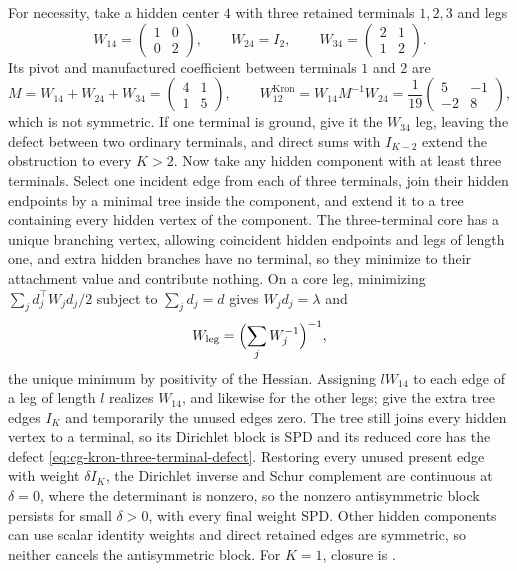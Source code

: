For necessity, take a hidden center \(4\) with three retained terminals
\(1,2,3\) and legs
\begin{equation}
W_{14}=\begin{pmatrix}1&0\\0&2\end{pmatrix},\qquad
W_{24}=I_2,\qquad
W_{34}=\begin{pmatrix}2&1\\1&2\end{pmatrix}.
\label{eq:cg-kron-three-terminal-weights}
\end{equation}
Its pivot and manufactured coefficient between terminals \(1\) and \(2\) are
\begin{equation}
M=W_{14}+W_{24}+W_{34}=\begin{pmatrix}4&1\\1&5\end{pmatrix},\qquad
W^{\mathrm{Kron}}_{12}=W_{14}M^{-1}W_{24}=
\frac1{19}\begin{pmatrix}5&-1\\-2&8\end{pmatrix},
\label{eq:cg-kron-three-terminal-defect}
\end{equation}
which is not symmetric. If one terminal is ground, give it the \(W_{34}\) leg,
leaving the defect between two ordinary terminals, and direct sums with
\(I_{K-2}\) extend the obstruction to every \(K>2\). Now take any hidden
component with at least three terminals. Select one incident edge from each of
three terminals, join their hidden endpoints by a minimal tree inside the
component, and extend it to a tree containing every hidden vertex of the
component. The three-terminal core has a unique branching vertex, allowing
coincident hidden endpoints and legs of length one, and extra hidden branches
have no terminal, so they minimize to their attachment value and contribute
nothing. On a core leg, minimizing \(\sum_jd_j^\top W_jd_j/2\) subject to
\(\sum_jd_j=d\) gives \(W_jd_j=\lambda\) and
\begin{equation}
W_{\mathrm{leg}}=\Bigl(\sum_jW_j^{-1}\Bigr)^{-1},
\label{eq:cg-kron-flat-series}
\end{equation}
the unique minimum by positivity of the Hessian. Assigning \(lW_{14}\) to each
edge of a leg of length \(l\) realizes \(W_{14}\), and likewise for the other
legs; give the extra tree edges \(I_K\) and temporarily the unused edges zero.
The tree still joins every hidden vertex to a terminal, so its Dirichlet block
is SPD and its reduced core has the defect
\eqref{eq:cg-kron-three-terminal-defect}. Restoring every unused present edge
with weight \(\delta I_K\), the Dirichlet inverse and Schur complement are
continuous at \(\delta=0\), where the determinant is nonzero, so the nonzero
antisymmetric block persists for small \(\delta>0\), with every final weight
SPD. Other hidden components can use scalar identity weights and direct retained
edges are symmetric, so neither cancels the antisymmetric block. For \(K=1\),
closure is .

